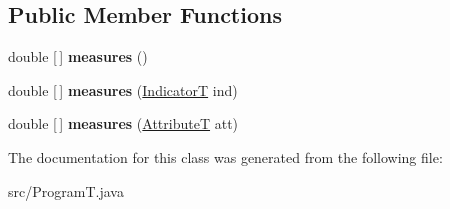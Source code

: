 \subsection*{Public Member Functions}
\begin{DoxyCompactItemize}
\item 
\mbox{\label{classsrc_1_1ProgramT_af9a7accf225be434e813dcc2792ca68a}} 
double \mbox{[}$\,$\mbox{]} {\bfseries measures} ()
\item 
\mbox{\label{classsrc_1_1ProgramT_a2b00d3ad913d8301d97a47be686288bb}} 
double \mbox{[}$\,$\mbox{]} {\bfseries measures} (\hyperlink{enumsrc_1_1IndicatorT}{IndicatorT} ind)
\item 
\mbox{\label{classsrc_1_1ProgramT_a8585d325828de39c9d4d0ae70e3bc374}} 
double \mbox{[}$\,$\mbox{]} {\bfseries measures} (\hyperlink{classsrc_1_1AttributeT}{AttributeT} att)
\end{DoxyCompactItemize}


The documentation for this class was generated from the following file\+:\begin{DoxyCompactItemize}
\item 
src/Program\+T.\+java\end{DoxyCompactItemize}
